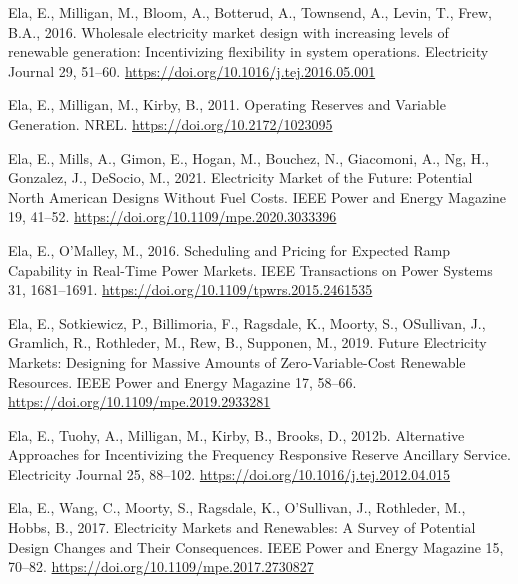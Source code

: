 \documentclass[12pt,a4paper,]{report}
\newlength{\cslhangindent}
\newenvironment{CSLReferences}[2] %
 {%
  \setlength{\parindent}{0pt}
  \ifodd #1 \everypar{\setlength{\hangindent}{\cslhangindent}}\ignorespaces\fi
  \ifnum #2 > 0
  \setlength{\parskip}{#2\baselineskip}
  \fi
 }%
 {}
\begin{document}
\begin{CSLReferences}{1}{0}
\leavevmode{}%
Ela, E., Milligan, M., Bloom, A., Botterud, A., Townsend, A., Levin, T.,
Frew, B.A., 2016. Wholesale electricity market design with increasing
levels of renewable generation: {Incentivizing} flexibility in system
operations. Electricity Journal 29, 51--60.
\url{https://doi.org/10.1016/j.tej.2016.05.001}

\leavevmode{}%
Ela, E., Milligan, M., Kirby, B., 2011. Operating {Reserves} and
{Variable Generation}. NREL. \url{https://doi.org/10.2172/1023095}

\leavevmode{}%
Ela, E., Mills, A., Gimon, E., Hogan, M., Bouchez, N., Giacomoni, A.,
Ng, H., Gonzalez, J., DeSocio, M., 2021. Electricity {Market} of the
{Future}: {Potential North American Designs Without Fuel Costs}. IEEE
Power and Energy Magazine 19, 41--52.
\url{https://doi.org/10.1109/mpe.2020.3033396}

\leavevmode{}%
Ela, E., O'Malley, M., 2016. Scheduling and {Pricing} for {Expected Ramp
Capability} in {Real-Time Power Markets}. IEEE Transactions on Power
Systems 31, 1681--1691. \url{https://doi.org/10.1109/tpwrs.2015.2461535}

\leavevmode{}%
Ela, E., Sotkiewicz, P., Billimoria, F., Ragsdale, K., Moorty, S.,
OSullivan, J., Gramlich, R., Rothleder, M., Rew, B., Supponen, M., 2019.
Future {Electricity Markets}: {Designing} for {Massive Amounts} of
{Zero-Variable-Cost Renewable Resources}. IEEE Power and Energy Magazine
17, 58--66. \url{https://doi.org/10.1109/mpe.2019.2933281}

\leavevmode{}%
Ela, E., Tuohy, A., Milligan, M., Kirby, B., Brooks, D., 2012b.
Alternative {Approaches} for {Incentivizing} the {Frequency Responsive
Reserve Ancillary Service}. Electricity Journal 25, 88--102.
\url{https://doi.org/10.1016/j.tej.2012.04.015}

\leavevmode{}%
Ela, E., Wang, C., Moorty, S., Ragsdale, K., O'Sullivan, J., Rothleder,
M., Hobbs, B., 2017. Electricity {Markets} and {Renewables}: {A Survey}
of {Potential Design Changes} and {Their Consequences}. IEEE Power and
Energy Magazine 15, 70--82.
\url{https://doi.org/10.1109/mpe.2017.2730827}


\end{CSLReferences}
\end{document}
